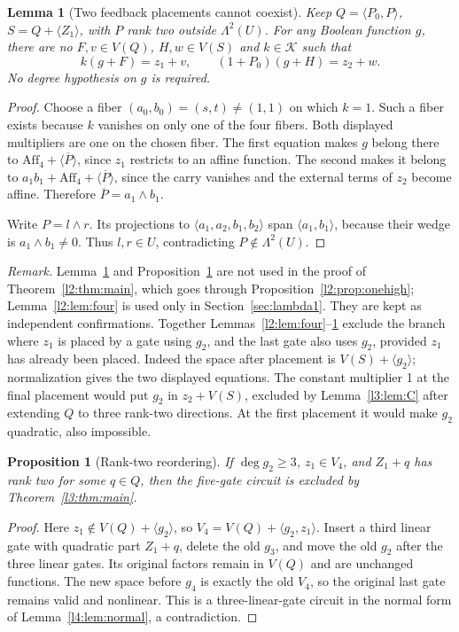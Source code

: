 \documentclass[11pt,a4paper]{article}
\theoremstyle{plain}
\newtheorem{lemma}[theorem]{Lemma}
\newtheorem{proposition}[theorem]{Proposition}
\theoremstyle{remark}
\newcommand{\Aff}{\mathrm{Aff}}
\begin{document}
\begin{lemma}[Two feedback placements cannot coexist]\label{l2:lem:two}
Keep $Q=\langle P_0,P\rangle$, $S=Q+\langle Z_1\rangle$, with $P$ rank two outside $\Lambda^2(U)$. For any Boolean function $g$, there are no $F,v\in V(Q)$, $H,w\in V(S)$ and $k\in\mathcal K$ such that
\[
k(g+F)=z_1+v,\qquad (1+P_0)(g+H)=z_2+w.
\]
No degree hypothesis on $g$ is required.
\end{lemma}
\begin{proof}
Choose a fiber $(a_0,b_0)=(s,t)\ne(1,1)$ on which $k=1$. Such a fiber exists because $k$ vanishes on only one of the four fibers. Both displayed multipliers are one on the chosen fiber. The first equation makes $g$ belong there to $\Aff_4+\langle\overline P\rangle$, since $z_1$ restricts to an affine function. The second makes it belong to $a_1b_1+\Aff_4+\langle\overline P\rangle$, since the carry vanishes and the external terms of $z_2$ become affine. Therefore $\overline P=a_1\wedge b_1$.

Write $P=l\wedge r$. Its projections to $\langle a_1,a_2,b_1,b_2\rangle$ span $\langle a_1,b_1\rangle$, because their wedge is $a_1\wedge b_1\ne0$. Thus $l,r\in U$, contradicting $P\notin\Lambda^2(U)$.
\end{proof}
\emph{Remark.} Lemma~\ref{l2:lem:two} and Proposition~\ref{l2:prop:reorder} are not used in the proof of Theorem~\ref{l2:thm:main}, which goes through Proposition~\ref{l2:prop:onehigh}; Lemma~\ref{l2:lem:four} is used only in Section~\ref{sec:lambda1}. They are kept as independent confirmations. Together Lemmas~\ref{l2:lem:four}--\ref{l2:lem:two} exclude the branch where $z_1$ is placed by a gate using $g_2$, and the last gate also uses $g_2$, provided $z_1$ has already been placed. Indeed the space after placement is $V(S)+\langle g_2\rangle$; normalization gives the two displayed equations. The constant multiplier 1 at the final placement would put $g_2$ in $z_2+V(S)$, excluded by Lemma~\ref{l3:lem:C} after extending $Q$ to three rank-two directions. At the first placement it would make $g_2$ quadratic, also impossible.

\begin{proposition}[Rank-two reordering]\label{l2:prop:reorder}
If $\deg g_2\ge3$, $z_1\in V_4$, and $Z_1+q$ has rank two for some $q\in Q$, then the five-gate circuit is excluded by Theorem~\ref{l3:thm:main}.
\end{proposition}
\begin{proof}
Here $z_1\notin V(Q)+\langle g_2\rangle$, so $V_4=V(Q)+\langle g_2,z_1\rangle$. Insert a third linear gate with quadratic part $Z_1+q$, delete the old $g_3$, and move the old $g_2$ after the three linear gates. Its original factors remain in $V(Q)$ and are unchanged functions. The new space before $g_4$ is exactly the old $V_4$, so the original last gate remains valid and nonlinear. This is a three-linear-gate circuit in the normal form of Lemma~\ref{l4:lem:normal}, a contradiction.
\end{proof}
\end{document}
